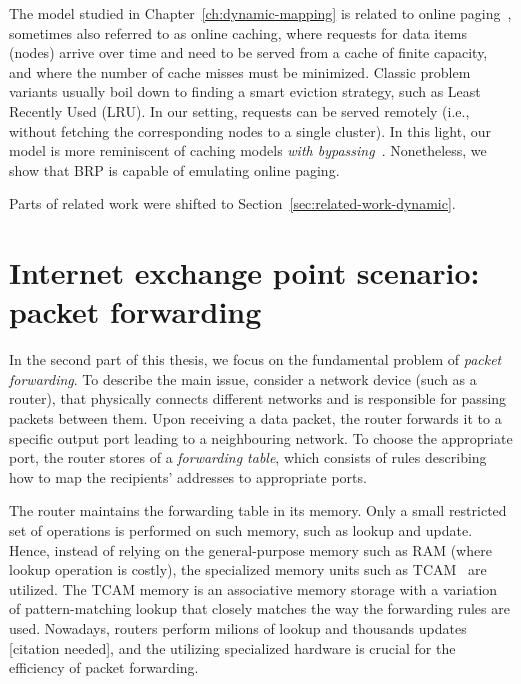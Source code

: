 
The model studied in Chapter~\ref{ch:dynamic-mapping}
is related to online
paging~\cite{SleTar85,FKLMSY91,McGSle91,AcChNo00}, sometimes also referred to
as online caching, where requests for data items (nodes) arrive over time and
need to be served from a cache of finite capacity, and where the number of
cache misses must be minimized. Classic problem variants usually boil down to
finding a smart eviction strategy, such as Least Recently Used (LRU). In our
setting, requests can be served remotely (i.e., without fetching the
corresponding nodes to a single cluster). In this light, our model is more
reminiscent of caching models \emph{with
bypassing}~\cite{EpImLN11,EpImLN15,Irani02}. Nonetheless, we show that BRP is
capable of emulating online paging.





Parts of related work were shifted to Section~\ref{sec:related-work-dynamic}.




\section{Internet exchange point scenario: packet forwarding}
\label{sec:intro-packet-forwarding}

In the second part of this thesis, we focus on the fundamental problem of \emph{packet forwarding}.
To describe the main issue, consider a network device (such as a router), that physically connects different networks and is responsible for passing packets between them.
Upon receiving a data packet, the router forwards it to a specific output port leading to a neighbouring network.
To choose the appropriate port, the router stores of a \emph{forwarding table}, which consists of rules describing how to map the recipients' addresses to appropriate ports.

The router maintains the forwarding table in its memory.
Only a small restricted set of operations is performed on such memory, such as lookup and update.
Hence, instead of relying on the general-purpose memory such as RAM (where lookup operation is costly), the specialized memory units such as TCAM~\cite{tcam-memory} are utilized.
The TCAM memory is an associative memory storage with a variation of pattern-matching lookup that closely matches the way the forwarding rules are used.
Nowadays, routers perform milions of lookup and thousands updates [citation needed], and the utilizing specialized hardware is crucial for the efficiency of packet forwarding.

